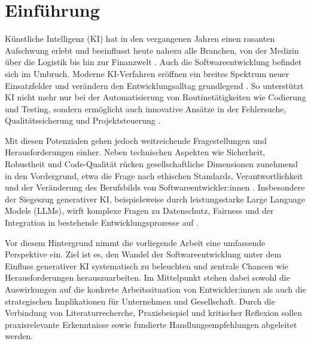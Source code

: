 \chapter{Einführung}


Künstliche Intelligenz (KI) hat in den vergangenen Jahren einen rasanten
Aufschwung erlebt und beeinflusst heute nahezu alle Branchen, von der Medizin
über die Logistik bis hin zur Finanzwelt \cite{a_ki_2024, s_future_2024}. Auch
die Softwareentwicklung befindet sich im Umbruch. Moderne KI-Verfahren eröffnen
ein breites Spektrum neuer Einsatzfelder und verändern den Entwicklungsalltag
grundlegend \cite{siebert_generative_2024}. So unterstützt KI nicht mehr nur
bei der Automatisierung von Routinetätigkeiten wie Codierung und Testing,
sondern ermöglicht auch innovative Ansätze in der Fehlersuche,
Qualitätssicherung und Projektsteuerung \cite{a_ki_2024,
    siebert_generative_2024}.

Mit diesen Potenzialen gehen jedoch weitreichende Fragestellungen und
Herausforderungen einher. Neben technischen Aspekten wie Sicherheit, Robustheit
und Code-Qualität rücken gesellschaftliche Dimensionen zunehmend in den
Vordergrund, etwa die Frage nach ethischen Standards, Verantwortlichkeit und
der Veränderung des Berufsbilds von Softwareentwickler:innen
\cite{braun_ki_2024, schmitt_generative_2024, weisz_design_2024}. Insbesondere
der Siegeszug generativer KI, beispielsweise durch leistungsstarke Large
Language Models (LLMs), wirft komplexe Fragen zu Datenschutz, Fairness und der
Integration in bestehende Entwicklungsprozesse auf \cite{s_future_2024,
    weisz_design_2024}.

Vor diesem Hintergrund nimmt die vorliegende Arbeit eine umfassende Perspektive
ein. Ziel ist es, den Wandel der Softwareentwicklung unter dem Einfluss
generativer KI systematisch zu beleuchten und zentrale Chancen wie
Herausforderungen herauszuarbeiten. Im Mittelpunkt stehen dabei sowohl die
Auswirkungen auf die konkrete Arbeitssituation von Entwickler:innen als auch
die strategischen Implikationen für Unternehmen und Gesellschaft. Durch die
Verbindung von Literaturrecherche, Praxisbeispiel und kritischer Reflexion
sollen praxisrelevante Erkenntnisse sowie fundierte Handlungsempfehlungen
abgeleitet werden.


